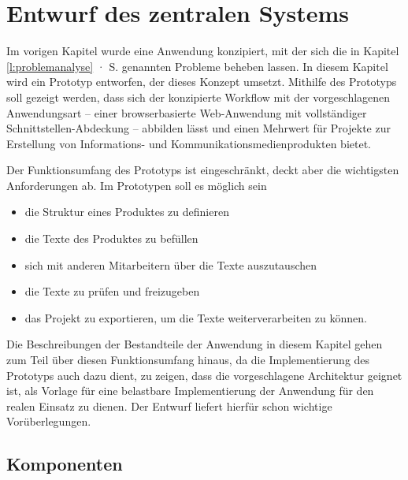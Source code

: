 \section{Entwurf des zentralen Systems}\label{l:entwurf}

Im vorigen Kapitel wurde eine Anwendung konzipiert, mit der sich die in Kapitel \ref{l:problemanalyse} · S.\pageref{l:problemanalyse} genannten Probleme beheben lassen. In diesem Kapitel wird ein Prototyp entworfen, der dieses Konzept umsetzt. Mithilfe des Prototyps soll gezeigt werden, dass sich der konzipierte Workflow mit der vorgeschlagenen Anwendungsart -- einer browserbasierte Web-Anwendung mit vollständiger Schnittstellen-Abdeckung -- abbilden lässt und einen Mehrwert für Projekte zur Erstellung von Informations- und Kommunikationsmedienprodukten bietet. 

Der Funktionsumfang des Prototyps ist eingeschränkt, deckt aber die wichtigsten Anforderungen ab. Im Prototypen soll es möglich sein
\begin{itemize}\itemsep -5pt
\item die Struktur eines Produktes zu definieren
\item die Texte des Produktes zu befüllen
\item sich mit anderen Mitarbeitern über die Texte auszutauschen
\item die Texte zu prüfen und freizugeben
\item das Projekt zu exportieren, um die Texte weiterverarbeiten zu können.
\end{itemize}

Die Beschreibungen der Bestandteile der Anwendung in diesem Kapitel gehen zum Teil über diesen Funktionsumfang hinaus, da die Implementierung des Prototyps auch dazu dient, zu zeigen, dass die vorgeschlagene Architektur geignet ist, als Vorlage für eine belastbare Implementierung der Anwendung für den realen Einsatz zu dienen. Der Entwurf liefert hierfür schon wichtige Vorüberlegungen.

\pagebreak

\subsection{Komponenten}

